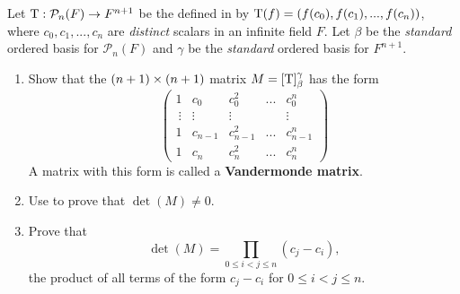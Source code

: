 \begin{exercise} \label{exercise 4.3.22}
Let \(\mathrm{T} : \mathcal{P}_n(F) \to F^{n + 1}\) be the \LTRAN{} defined in  by \(\mathrm{T}(f) = (f(c_0), f(c_1), ..., f(c_n))\), where \(c_0, c_1, ..., c_n\) are \emph{distinct} scalars in an infinite field \(F\).
Let \(\beta\) be the \emph{standard} ordered basis for \(\mathcal{P}_n(F)\) and \(\gamma\) be the \emph{standard} ordered basis for \(F^{n + 1}\).
\begin{enumerate}
\item Show that the \((n + 1) \times (n + 1)\) matrix \(M = [\mathrm{T}]_{\beta}^{\gamma}\) has the form
\[
    \begin{pmatrix}
        1 & c_0 & c_0^2 & ... & c_0^n \\\
        \vdots & \vdots & \vdots & & \vdots \\
        1 & c_{n-1} & c_{n-1}^2 & ... & c_{n-1}^n \\
        1 & c_n & c_n^2 & ... & c_n^n
    \end{pmatrix}
\]
A matrix with this form is called a \textbf{Vandermonde matrix}.
\item Use \EXEC{2.4.22} to prove that \(\det(M) \ne 0\).
\item Prove that
\[
    \det(M) = \prod_{0 \le i < j \le n} (c_j - c_i),
\]
the product of all terms of the form \(c_j - c_i\) for \(0 \le i < j \le n\).
\end{enumerate}
\end{exercise}

